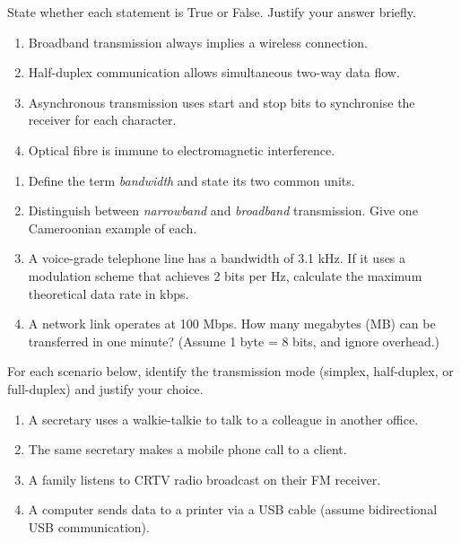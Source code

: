 \documentclass[11pt]{article}
\begin{document}
\begin{exercice}
State whether each statement is True or False. Justify your answer briefly.

\begin{enumerate}
\item Broadband transmission always implies a wireless connection.
\item Half-duplex communication allows simultaneous two-way data flow.
\item Asynchronous transmission uses start and stop bits to synchronise the receiver for each character.
\item Optical fibre is immune to electromagnetic interference.
\end{enumerate}
\end{exercice}

\begin{exercice}
\begin{enumerate}
\item Define the term \emph{bandwidth} and state its two common units.
\item Distinguish between \emph{narrowband} and \emph{broadband} transmission. Give one Cameroonian example of each.
\item A voice-grade telephone line has a bandwidth of 3.1 kHz. If it uses a modulation scheme that achieves 2 bits per Hz, calculate the maximum theoretical data rate in kbps.
\item A network link operates at 100 Mbps. How many megabytes (MB) can be transferred in one minute? (Assume 1 byte = 8 bits, and ignore overhead.)
\end{enumerate}
\end{exercice}

\begin{exercice}
For each scenario below, identify the transmission mode (simplex, half-duplex, or full-duplex) and justify your choice.

\begin{enumerate}
\item A secretary uses a walkie-talkie to talk to a colleague in another office.
\item The same secretary makes a mobile phone call to a client.
\item A family listens to CRTV radio broadcast on their FM receiver.
\item A computer sends data to a printer via a USB cable (assume bidirectional USB communication).
\end{enumerate}
\end{exercice}
\end{document}
